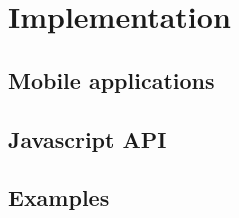 
\chapter{Implementation}
\label{chapter:implementation}

\section{Mobile applications}
\label{sec:mobile_applications}

\section{Javascript API}
\label{sec:javascript_api}

\section{Examples}
\label{sec:examples}
